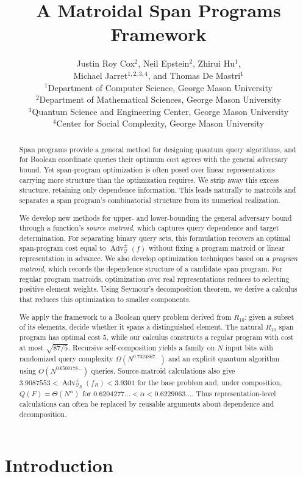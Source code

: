 \documentclass[11pt]{article}
\title{A Matroidal Span Programs Framework}
\author{
Justin Roy Cox$^{2}$, Neil Epstein$^{2}$, Zhirui Hu$^{1}$,\\
Michael Jarret$^{1,2,3,4}$, and Thomas De Mastri$^{1}$\\[0.75em]
\small $^{1}$Department of Computer Science, George Mason University\\
\small $^{2}$Department of Mathematical Sciences, George Mason University\\
\small $^{3}$Quantum Science and Engineering Center, George Mason University\\
\small $^{4}$Center for Social Complexity, George Mason University
}
\date{}
\numberwithin{equation}{section}
\theoremstyle{remark}
\begin{document}
\maketitle

\begin{abstract}
Span programs provide a general method for designing quantum query algorithms,
and for Boolean coordinate queries their optimum cost agrees with the general
adversary bound. Yet span-program optimization is often posed over linear
representations carrying more structure than the optimization requires. We
strip away this excess structure, retaining only dependence information. This
leads naturally to matroids and separates a span program's combinatorial
structure from its numerical realization.

We develop new methods for upper- and lower-bounding the general adversary
bound through a function's \emph{source matroid}, which captures query
dependence and target determination. For separating binary query sets, this
formulation recovers an optimal span-program cost equal to
$\operatorname{Adv}^{\pm}_{\mathcal Q}(f)$ without fixing a program matroid
or linear representation in advance. We also develop optimization techniques
based on a \emph{program matroid}, which records the dependence structure of
a candidate span program. For regular program matroids, optimization over real
representations reduces to selecting positive element weights. Using Seymour's
decomposition theorem, we derive a calculus that reduces this optimization to
smaller components.

We apply the framework to a Boolean query problem derived from $R_{10}$:
given a subset of its elements, decide whether it spans a distinguished
element. The natural $R_{10}$ span program has optimal cost $5$, while our
calculus constructs a regular program with cost at most $\sqrt{87/5}$.
Recursive self-composition yields a family on $N$ input bits with randomized
query complexity $\Omega(N^{0.7324867\ldots})$ and an explicit quantum
algorithm using $O(N^{0.6500178\ldots})$ queries. Source-matroid calculations
also give
$3.9087553<\operatorname{Adv}^{\pm}_{\mathcal Q_R}(f_R)<3.9301$
for the base problem and, under composition,
$Q(F)=\Theta(N^\alpha)$ for
$0.6204277\ldots<\alpha<0.6229063\ldots$.
Thus representation-level calculations can often be replaced by reusable
arguments about dependence and decomposition.
\end{abstract}

\tableofcontents

\section{Introduction}
\label{sec:introduction}
\end{document}
